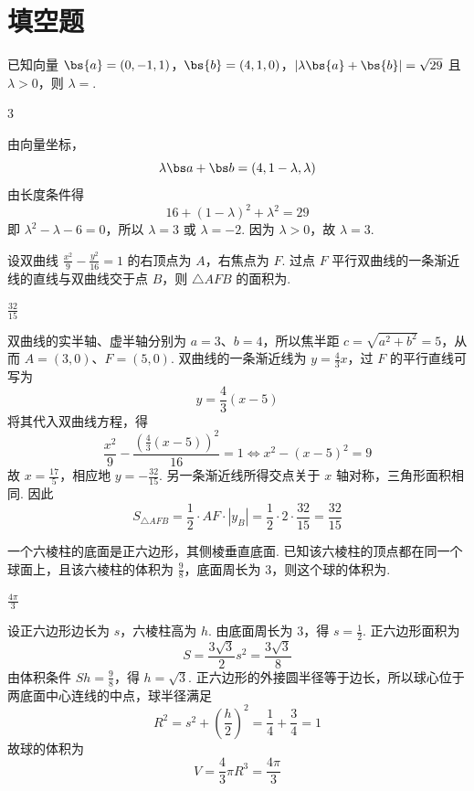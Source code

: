 \section{填空题}

\begin{problem}
已知向量 \(\bs{a} = (0, -1, 1)\)，\(\bs{b} = (4, 1, 0)\)，\(|\lambda \bs{a} + \bs{b}| = \sqrt{29}\) 且 \(\lambda > 0\)，则 \(\lambda = \)\fillinblank{}.
\begin{answer}
3
\end{answer}

\begin{solution}
由向量坐标，
\[
\lambda\bs a+\bs b=\left(4,1-\lambda,\lambda\right)
\]
由长度条件得
\[
16+\left(1-\lambda\right)^2+\lambda^2=29
\]
即 \(\lambda^2-\lambda-6=0\)，所以 \(\lambda=3\) 或 \(\lambda=-2\). 因为 \(\lambda>0\)，故 \(\lambda=3\).
\end{solution}
\end{problem}

\begin{problem}
设双曲线 \(\frac{x^2}{9} - \frac{y^2}{16} = 1\) 的右顶点为 \(A\)，右焦点为 \(F\). 过点 \(F\) 平行双曲线的一条渐近线的直线与双曲线交于点 \(B\)，则 \(\triangle AFB\) 的面积为\fillinblank{}.
\begin{answer}
\(\frac{32}{15}\)
\end{answer}

\begin{solution}
双曲线的实半轴、虚半轴分别为 \(a=3\)、\(b=4\)，所以焦半距
\(c=\sqrt{a^2+b^2}=5\)，从而 \(A=\left(3,0\right)\)、\(F=\left(5,0\right)\). 双曲线的一条渐近线为 \(y=\frac43x\)，过 \(F\) 的平行直线可写为
\[
y=\frac43\left(x-5\right)
\]
将其代入双曲线方程，得
\[
\frac{x^2}{9}-\frac{\left(\frac43\left(x-5\right)\right)^2}{16}=1
\Longleftrightarrow x^2-\left(x-5\right)^2=9
\]
故 \(x=\frac{17}{5}\)，相应地 \(y=-\frac{32}{15}\). 另一条渐近线所得交点关于 \(x\) 轴对称，三角形面积相同. 因此
\[
S_{\triangle AFB}=\frac12\cdot AF\cdot\left|y_B\right|
=\frac12\cdot2\cdot\frac{32}{15}=\frac{32}{15}
\]
\end{solution}
\end{problem}

\begin{problem}
一个六棱柱的底面是正六边形，其侧棱垂直底面. 已知该六棱柱的顶点都在同一个球面上，且该六棱柱的体积为 \(\frac{9}{8}\)，底面周长为 \(3\)，则这个球的体积为\fillinblank{}.
\begin{answer}
\(\frac{4\pi}{3}\)
\end{answer}

\begin{solution}
设正六边形边长为 \(s\)，六棱柱高为 \(h\). 由底面周长为 \(3\)，得 \(s=\frac12\). 正六边形面积为
\[
S=\frac{3\sqrt3}{2}s^2=\frac{3\sqrt3}{8}
\]
由体积条件 \(Sh=\frac98\)，得 \(h=\sqrt3\). 正六边形的外接圆半径等于边长，所以球心位于两底面中心连线的中点，球半径满足
\[
R^2=s^2+\left(\frac h2\right)^2=\frac14+\frac34=1
\]
故球的体积为
\[
V=\frac43\pi R^3=\frac{4\pi}{3}
\]
\end{solution}
\end{problem}

